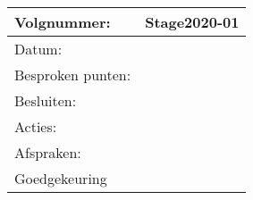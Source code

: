 \begin{tabularx}{\textwidth}{| l | X |}
  \hline
  Volgnummer: & Stage2020-01\\
  \hline
  Datum: & \\
  \hline
  Besproken punten: & \\
  \hline
  Besluiten: & \\
  Acties: & \\
  Afspraken: & \\
  \hline
  Goedgekeuring & \\
  \hline
\end{tabularx}